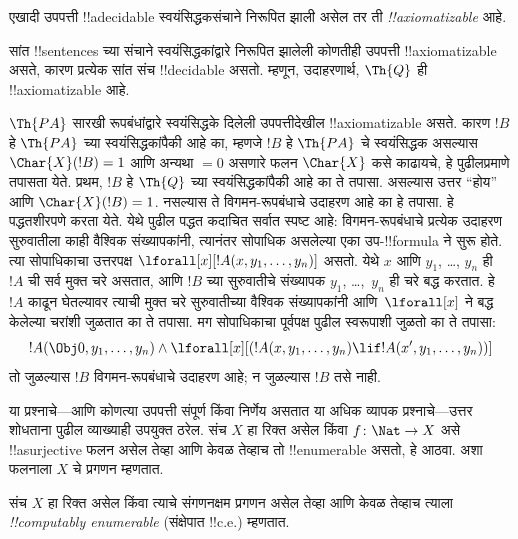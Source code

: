 \documentclass[../../../include/open-logic-section]{subfiles}
\begin{document}
\begin{defn}
एखादी उपपत्ती !!a{decidable} स्वयंसिद्धकसंचाने निरूपित झाली असेल तर ती
\emph{!!{axiomatizable}} आहे.
\end{defn}

\begin{ex}
सांत !!{sentence}s च्या संचाने स्वयंसिद्धकांद्वारे निरूपित
झालेली कोणतीही उपपत्ती !!{axiomatizable} असते, कारण प्रत्येक
सांत संच !!{decidable} असतो. म्हणून, उदाहरणार्थ, $\Th{Q}$ ही
!!{axiomatizable} आहे.

$\Th{PA}$ सारखी रूपबंधांद्वारे स्वयंसिद्धके दिलेली उपपत्तीदेखील
!!{axiomatizable} असते. कारण $!B$ हे $\Th{PA}$ च्या स्वयंसिद्धकांपैकी
आहे का, म्हणजे $!B$ हे $\Th{PA}$ चे स्वयंसिद्धक असल्यास
$\Char{X}(!B) = 1$ आणि
अन्यथा $= 0$ असणारे फलन $\Char{X}$ कसे काढायचे, हे पुढीलप्रमाणे
तपासता येते. प्रथम, $!B$ हे $\Th{Q}$ च्या स्वयंसिद्धकांपैकी आहे
का ते तपासा. असल्यास उत्तर ``होय'' आणि $\Char{X}(!B) = 1$.
नसल्यास ते विगमन-रूपबंधाचे उदाहरण आहे का हे तपासा. हे पद्धतशीरपणे
करता येते. येथे पुढील पद्धत कदाचित सर्वात स्पष्ट आहे: विगमन-रूपबंधाचे
प्रत्येक उदाहरण सुरुवातीला काही वैश्विक संख्यापकांनी, त्यानंतर
सोपाधिक असलेल्या एका उप-!!{formula} ने सुरू होते. त्या सोपाधिकाचा
उत्तरपक्ष $\lforall[x][!A(x, y_1, \dots, y_n)]$ असतो. येथे $x$
आणि $y_1$, \dots, $y_n$ ही~$!A$ ची सर्व मुक्त चरे असतात, आणि
$!B$ च्या सुरुवातीचे संख्यापक $y_1$, \dots,~$y_n$ ही चरे बद्ध
करतात. हे~$!A$ काढून घेतल्यावर त्याची मुक्त चरे सुरुवातीच्या
वैश्विक संख्यापकांनी आणि~$\lforall[x]$ ने बद्ध केलेल्या चरांशी
जुळतात का ते तपासा. मग सोपाधिकाचा पूर्वपक्ष पुढील स्वरूपाशी जुळतो
का ते तपासा:
\[
!A(\Obj 0, y_1, \dots, y_n) \land \lforall[x][(!A(x, y_1, \dots, y_n)
\lif !A(x', y_1, \dots, y_n))]
\]
तो जुळल्यास $!B$ विगमन-रूपबंधाचे उदाहरण आहे; न जुळल्यास $!B$ तसे नाही.
\end{ex}

या प्रश्नाचे---आणि कोणत्या उपपत्ती संपूर्ण किंवा निर्णेय असतात या
अधिक व्यापक प्रश्नाचे---उत्तर शोधताना पुढील व्याख्याही उपयुक्त ठरेल.
संच $X$ हा रिक्त असेल किंवा $f \colon \Nat
\to X$ असे !!a{surjective} फलन असेल तेव्हा आणि केवळ तेव्हाच तो !!{enumerable}
असतो, हे आठवा. अशा फलनाला $X$ चे प्रगणन म्हणतात.

\begin{defn}
संच $X$ हा रिक्त असेल किंवा त्याचे संगणनक्षम प्रगणन असेल तेव्हा आणि केवळ तेव्हाच
त्याला \emph{!!{computably enumerable}} (संक्षेपात !!{c.e.}) म्हणतात.
\end{defn}
\end{document}
